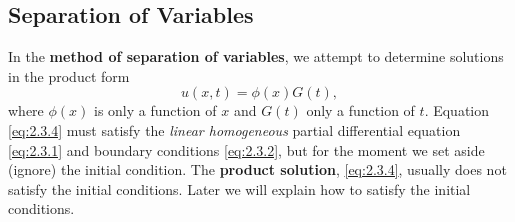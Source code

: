 \subsection{Separation of Variables}
\label{sec:2.3.2}

In the \textbf{method of separation of variables}, we attempt to determine solutions in the product form
\begin{equation}
\label{eq:2.3.4}
\boxed{u(x,t) = \phi(x)G(t),}
\end{equation}
where $\phi(x)$ is only a function of $x$ and $G(t)$ only a function of $t$. Equation \eqref{eq:2.3.4} must satisfy the \emph{linear homogeneous} partial differential equation \eqref{eq:2.3.1} and boundary conditions \eqref{eq:2.3.2}, but for the moment we set aside (ignore) the initial condition. The \textbf{product solution}, \eqref{eq:2.3.4}, usually does not satisfy the initial conditions. Later we will explain how to satisfy the initial conditions.


